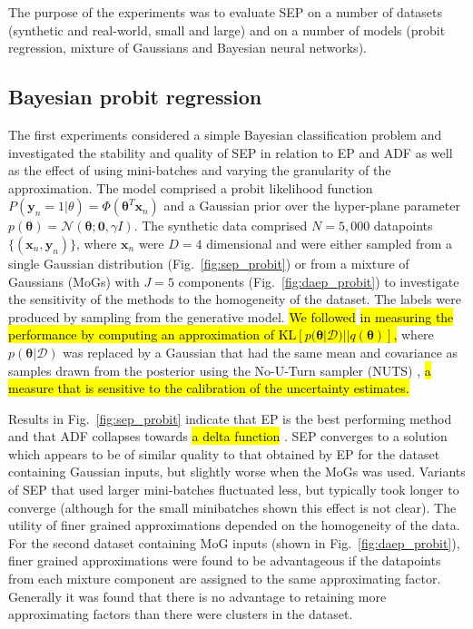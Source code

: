 
The purpose of the experiments was to evaluate SEP on a number of datasets (synthetic and real-world, small and large) and on a number of models (probit regression, mixture of Gaussians and Bayesian neural networks).

\subsection{Bayesian probit regression}
%
The first experiments considered a simple Bayesian classification problem and investigated the stability and quality of SEP in relation to EP and ADF as well as the effect of using mini-batches and varying the granularity of the approximation. The model comprised a probit likelihood function $P(\bm{y}_n = 1|\theta) = \Phi(\bm{\theta}^T \bm{x}_n)$ and a Gaussian prior over the hyper-plane parameter  $p(\bm{\theta}) = \mathcal{N}(\bm{\theta}; \bm{0}, \gamma I)$.  
%
The synthetic data comprised $N=5,000$ datapoints $\{ (\bm{x}_n, \bm{y}_n) \}$, where $\bm{x}_n$ were $D=4$ dimensional and were either sampled from a single Gaussian distribution (Fig.~\ref{fig:sep_probit}) or from a mixture of Gaussians (MoGs) with $J=5$ components (Fig.~\ref{fig:daep_probit}) to investigate the sensitivity of the methods to the homogeneity of the dataset. The labels were produced by sampling from the generative model. \hl{We followed} \cite{xu:sms} \hl{in measuring the performance by computing an approximation of $\mathrm{KL}[p(\bm{\theta}|\mathcal{D}) || q(\bm{\theta})]$,} where $p(\bm{\theta}|\mathcal{D})$ was replaced by a Gaussian that had the same mean and covariance as samples drawn from the posterior using the No-U-Turn sampler (NUTS) \cite{hoffman:nuts}, \hl{a measure that is sensitive to the calibration of the uncertainty estimates.}

Results in Fig.~\ref{fig:sep_probit} indicate that EP is the best performing method and that ADF collapses towards \hl{a delta function} . SEP converges to a solution which appears to be of similar quality to that obtained by EP for the dataset containing Gaussian inputs, but slightly worse when the MoGs was used. Variants of SEP that used larger mini-batches fluctuated less, but typically took longer to converge (although for the small minibatches shown this effect is not clear). The utility of finer grained approximations depended on the homogeneity of the data. For the second dataset containing MoG inputs (shown in Fig.~\ref{fig:daep_probit}), finer grained approximations were found to be advantageous if the datapoints from each mixture component are assigned to the same approximating factor. Generally it was found that there is no advantage to retaining more approximating factors than there were clusters in the dataset.  


